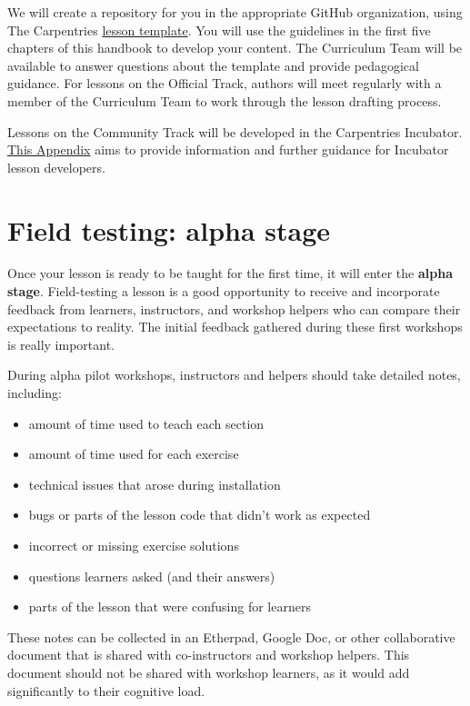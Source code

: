 \documentclass[
]{book}
\providecommand{\tightlist}{%
  \setlength{\itemsep}{0pt}\setlength{\parskip}{0pt}}
\begin{document}
We will create a repository for you in the appropriate
GitHub organization, using The Carpentries
\href{https://github.com/carpentries/styles}{lesson template}. You will use the
guidelines in the first five chapters of this handbook
to develop your content. The Curriculum Team will
be available to answer questions about the template
and provide pedagogical guidance. For lessons on the
Official Track, authors will meet regularly with
a member of the Curriculum Team to work through the
lesson drafting process.

Lessons on the Community Track will be developed in the Carpentries Incubator.
\href{the-carpentries-incubator.html}{This Appendix} aims to provide
information and further guidance for Incubator lesson developers.

\hypertarget{field-testing-alpha-stage}{%
\section{Field testing: alpha stage}\label{field-testing-alpha-stage}}

Once your lesson is ready to be taught for the first
time, it will enter the \textbf{alpha stage}. Field-testing a
lesson is a good opportunity to receive and incorporate
feedback from learners, instructors, and workshop
helpers who can compare their expectations to
reality. The initial feedback gathered during these first
workshops is really important.

During alpha pilot workshops, instructors and helpers should take detailed notes, including:

\begin{itemize}
\tightlist
\item
  amount of time used to teach each section
\item
  amount of time used for each exercise
\item
  technical issues that arose during installation
\item
  bugs or parts of the lesson code that didn't work as expected
\item
  incorrect or missing exercise solutions
\item
  questions learners asked (and their answers)
\item
  parts of the lesson that were confusing for learners
\end{itemize}

These notes can be collected in an Etherpad, Google Doc, or other collaborative document that is shared
with co-instructors and workshop helpers. This document should not be shared with workshop learners,
as it would add significantly to their cognitive load.
\end{document}
